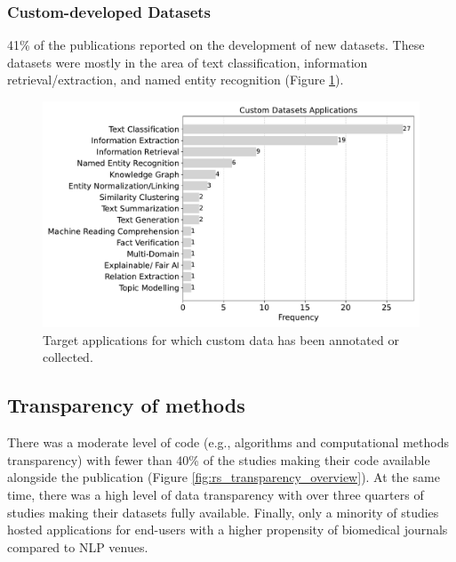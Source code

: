 \documentclass[fleqn,10pt]{olplainarticle}
\begin{document}

\subsubsection*{Custom-developed Datasets}

41\% of the publications reported on the development of new datasets. These datasets were mostly in the area of text classification, information retrieval/extraction, and named entity recognition (Figure \ref{fig:custom_data}).

\begin{figure}[!ht]
\begin{center}
\includegraphics[scale=0.4]{visuals/new_pdf/custom_dataset_nlp_task_2024.pdf} %
\caption{Target applications for which custom data has been annotated or collected.}
\label{fig:custom_data}
\end{center}
\end{figure}

\subsection*{Transparency of methods}
There was a moderate level of code (e.g., algorithms and computational methods transparency) with fewer than 40\% of the studies making their code available alongside the publication (Figure \ref{fig:rs_transparency_overview}). At the same time, there was a high level of data transparency with over three quarters of studies making their datasets fully available. Finally, only a minority of studies hosted applications for end-users with a higher propensity of biomedical journals compared to NLP venues.
\end{document}
